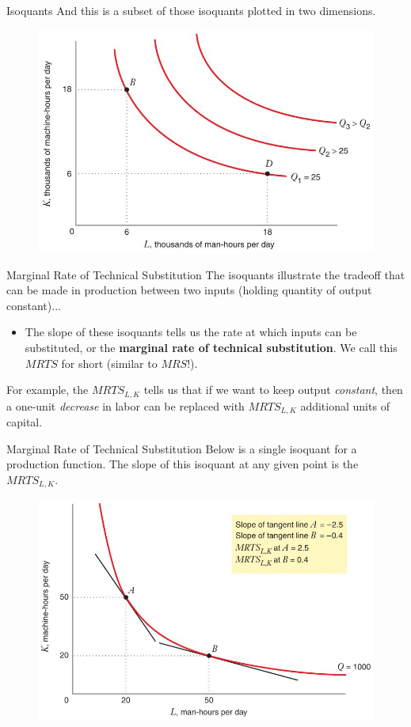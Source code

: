 \documentclass[11pt,t]{beamer}
\begin{document}
\begin{frame}{Isoquants}
  And this is a subset of those isoquants plotted in two dimensions.
  
  \begin{figure}
    \includegraphics[width=0.9\linewidth]{figures/fig6_8.jpg}
  \end{figure}
\end{frame}

\begin{frame}{Marginal Rate of Technical Substitution}
  The isoquants illustrate the tradeoff that can be made in production between two inputs (holding quantity of output constant)...
  
  \bigskip
  \begin{itemize}
    \item The slope of these isoquants tells us the rate at which inputs can be substituted, or the \textbf{marginal rate of technical substitution}. We call this $MRTS$ for short (similar to $MRS$!).
  \end{itemize}

  \pause\bigskip
  For example, the $MRTS_{L,K}$ tells us that if we want to keep output \emph{constant}, then a one-unit \textit{decrease} in labor can be replaced with $MRTS_{L, K}$ additional units of capital.
\end{frame}

\begin{frame}{Marginal Rate of Technical Substitution}
  Below is a single isoquant for a production function. The slope of this isoquant at any given point is the $MRTS_{L,K}$.
  
  \begin{figure}
    \includegraphics[width=0.8\linewidth]{figures/fig6_10.jpg}
  \end{figure}
\end{frame}
\end{document}
